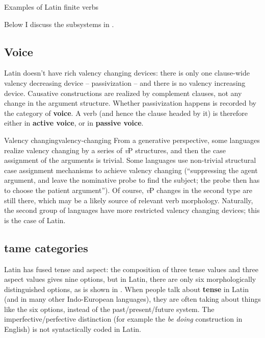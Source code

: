 \documentclass[a4paper, oneside]{report}
\newcommand*{\concept}[1]{\textbf{#1}}
\newcommand{\form}[1]{\emph{#1}}
\newcommand{\vP}{\textit{v}P}
\begin{document}
\begin{sidewaystable}
    \centering
    \caption{Examples of Latin finite verbs}
    \label{tbl:latin-finite-verbs}
        
\end{sidewaystable}

Below I discuss the subsystems in .

\subsection{Voice}

Latin doesn't have rich valency changing devices:
there is only one clause-wide valency decreasing device -- passivization -- 
and there is no valency increasing device.
Causative constructions are realized by complement clauses,
not any change in the argument structure.
Whether passivization happens is recorded by the category of \concept{voice}.
A verb (and hence the clause headed by it) is therefore either in \concept{active voice},
or in \concept{passive voice}.

\begin{theorybox}{Valency changing}{valency-changing}
    From a generative perspective, some languages realize valency changing 
    by a series of \vP{} structures, and then the case assignment of the arguments is trivial.
    Some languages use non-trivial structural case assignment mechanisms
    to achieve valency changing 
    (``suppressing the agent argument, 
    and leave the nominative probe to find the subject;
    the probe then has to choose the patient argument'').
    Of course, \vP{} changes in the second type are still there,
    which may be a likely source of relevant verb morphology.
    Naturally, the second group of languages have more restricted valency changing devices;
    this is the case of Latin.
\end{theorybox}

\subsection{\acs{tame} categories}\label{sec:verb-inflection.finite-template.tame}

Latin has fused tense and aspect:
the composition of three tense values and three aspect values 
gives nine options,
but in Latin, there are only six morphologically distinguished options,
as is shown in . 
When people talk about \concept{tense} in Latin (and in many other Indo-European languages),
they are often taking about things like the six options,
instead of the past/present/future system.
The imperfective/perfective distinction 
(for example the \form{be doing} construction in English)
is not syntactically coded in Latin.
\end{document}
